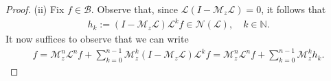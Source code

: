 \documentclass[10pt,a4paper]{amsart}
\newcommand*{\natu}{\mathbb{N}}
\newcommand*{\nul}{\mathscr{N}}
\newcommand{\bspace}{\mathcal{B}}
\newcommand{\lein}{\mathcal{L}}
\newcommand{\mul}{\mathcal{M}_z}
\begin{document}
\begin{proof}
 
(ii) Fix $f\in \bspace$. Observe that, since $\lein(I-\mul\lein)=0$, it follows that
\begin{align*}
    h_k:=(I-\mul\lein)\lein^kf\in \nul(\lein), \quad k\in \natu.
\end{align*} It now suffices to observe that we can write
    \begin{align*}
        f= \mul^n\lein^nf+\sum_{k=0}^{n-1}\mul^k(I-\mul\lein)\lein^kf=  \mul^n\lein^nf+\sum_{k=0}^{n-1}\mul^kh_k.
    \end{align*}
\end{proof}
\end{document}
